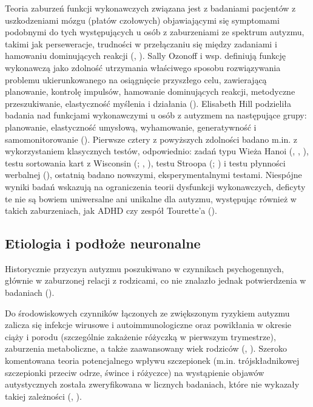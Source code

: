     Teoria zaburzeń funkcji wykonawczych związana jest z badaniami pacjentów z uszkodzeniami mózgu (płatów czołowych) objawiającymi się symptomami podobnymi do tych występujących u osób z zaburzeniami ze spektrum autyzmu, takimi jak perseweracje, trudności w przełączaniu się między zadaniami i hamowaniu dominujących reakcji (\cite{frith2008autyzm}, \cite{russell1997autism}).
    Sally Ozonoff i wsp. definiują funkcję wykonawczą jako zdolność utrzymania właściwego sposobu rozwiązywania problemu ukierunkowanego na osiągnięcie przyszłego celu, zawierającą planowanie, kontrolę impulsów, hamowanie dominujących reakcji, metodyczne przeszukiwanie, elastyczność myślenia i działania (\cite{ozonoff1991executive}).
    Elisabeth Hill podzieliła badania nad funkcjami wykonawczymi u osób z autyzmem na następujące grupy: planowanie, elastyczność umysłową, wyhamowanie, generatywność i samomonitorowanie (\cite{hill2004evaluating}).
    Pierwsze cztery z powyższych zdolności badano m.in. z wykorzystaniem klasycznych testów, odpowiednio: zadań typu Wieża Hanoi (\cite{ozonoff1991executive}, \cite{bennetto1996intact}, \cite{ozonoff1999brief}), testu sortowania kart z Wisconsin (\cite{grant1948behavioral}; \cite{ozonoff1991executive}, \cite{ozonoff1999brief}), testu Stroopa (\cite{stroop1935studies}; \cite{ozonoff1999brief}) i testu płynności werbalnej (\cite{turner1999generating}), ostatnią badano nowszymi, eksperymentalnymi testami. 
    Niespójne wyniki badań wskazują na ograniczenia teorii dysfunkcji wykonawczych, deficyty te nie są bowiem uniwersalne ani unikalne dla autyzmu, występując również w takich zaburzeniach, jak ADHD czy zespół Tourette'a (\cite{hill2004evaluating}).
    
    \subsection{Etiologia i podłoże neuronalne}
    Historycznie przyczyn autyzmu poszukiwano w czynnikach psychogennych, głównie w zaburzonej relacji z rodzicami, co nie znalazło jednak potwierdzenia w badaniach (\cite{komender2012autyzm}). 
    
    Do środowiskowych czynników łączonych ze zwiększonym ryzykiem autyzmu zalicza się infekcje wirusowe i autoimmunologiczne oraz powikłania w okresie ciąży i porodu (szczególnie zakażenie różyczką w pierwszym trymestrze), zaburzenia metaboliczne, a także zaawansowany wiek rodziców (\cite{komender2012autyzm}, \cite{frith2008autyzm}).
    Szeroko komentowana teoria potencjalnego wpływu szczepionek (m.in. trójskładnikowej szczepionki przeciw odrze, śwince i różyczce) na wystąpienie objawów autystycznych została zweryfikowana w licznych badaniach, które nie wykazały takiej zależności (\cite{frith2008autyzm}, \cite{taylor2014vaccines}).
    
